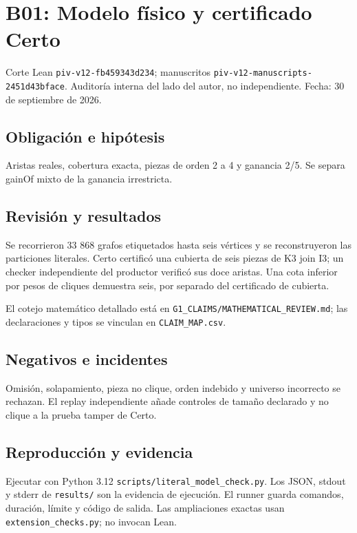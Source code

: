 \documentclass[11pt]{article}
\begin{document}
\section{B01: Modelo físico y certificado
Certo}\label{b01-modelo-fuxedsico-y-certificado-certo}

Corte Lean \nolinkurl{piv-v12-fb459343d234}; manuscritos
\nolinkurl{piv-v12-manuscripts-2451d43bface}. Auditoría interna del lado
del autor, no independiente. Fecha: 30 de septiembre de 2026.

\subsection{Obligación e hipótesis}\label{obligaciuxf3n-e-hipuxf3tesis}

Aristas reales, cobertura exacta, piezas de orden 2 a 4 y ganancia 2/5.
Se separa gainOf mixto de la ganancia irrestricta.

\subsection{Revisión y resultados}\label{revisiuxf3n-y-resultados}

Se recorrieron 33 868 grafos etiquetados hasta seis vértices y se
reconstruyeron las particiones literales. Certo certificó una cubierta
de seis piezas de K3 join I3; un checker independiente del productor
verificó sus doce aristas. Una cota inferior por pesos de cliques
demuestra seis, por separado del certificado de cubierta.

El cotejo matemático detallado está en
\nolinkurl{G1_CLAIMS/MATHEMATICAL_REVIEW.md}; las declaraciones y tipos
se vinculan en \nolinkurl{CLAIM_MAP.csv}.

\subsection{Negativos e incidentes}\label{negativos-e-incidentes}

Omisión, solapamiento, pieza no clique, orden indebido y universo
incorrecto se rechazan. El replay independiente añade controles de
tamaño declarado y no clique a la prueba tamper de Certo.

\subsection{Reproducción y evidencia}\label{reproducciuxf3n-y-evidencia}

Ejecutar con Python 3.12 \nolinkurl{scripts/literal_model_check.py}. Los
JSON, stdout y stderr de \nolinkurl{results/} son la evidencia de
ejecución. El runner guarda comandos, duración, límite y código de
salida. Las ampliaciones exactas usan \nolinkurl{extension_checks.py}; no
invocan Lean.
\end{document}
